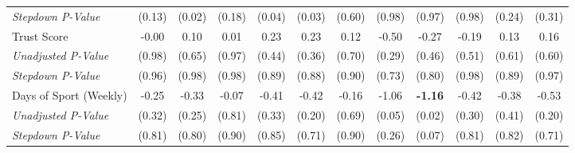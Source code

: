 \begin{tabular}{l c c c c c c c c c c c}
\quad \textit{Stepdown P-Value} & (0.13) & (0.02) & (0.18) & (0.04) & (0.03) & (0.60) & (0.98) & (0.97) & (0.98) & (0.24) & (0.31) \\
Trust Score & -0.00 & 0.10 & 0.01 & 0.23 & 0.23 & 0.12 & -0.50 & -0.27 & -0.19 & 0.13 & 0.16 \\
\quad \textit{Unadjusted P-Value} & (0.98) & (0.65) & (0.97) & (0.44) & (0.36) & (0.70) & (0.29) & (0.46) & (0.51) & (0.61) & (0.60) \\
\quad \textit{Stepdown P-Value} & (0.96) & (0.98) & (0.98) & (0.89) & (0.88) & (0.90) & (0.73) & (0.80) & (0.98) & (0.89) & (0.97) \\
Days of Sport (Weekly) & -0.25 & -0.33 & -0.07 & -0.41 & -0.42 & -0.16 & -1.06 & \textbf{ -1.16 } & -0.42 & -0.38 & -0.53 \\
\quad \textit{Unadjusted P-Value} & (0.32) & (0.25) & (0.81) & (0.33) & (0.20) & (0.69) & (0.05) & (0.02) & (0.30) & (0.41) & (0.20) \\
\quad \textit{Stepdown P-Value} & (0.81) & (0.80) & (0.90) & (0.85) & (0.71) & (0.90) & (0.26) & (0.07) & (0.81) & (0.82) & (0.71) \\
\bottomrule
\end{tabular}
